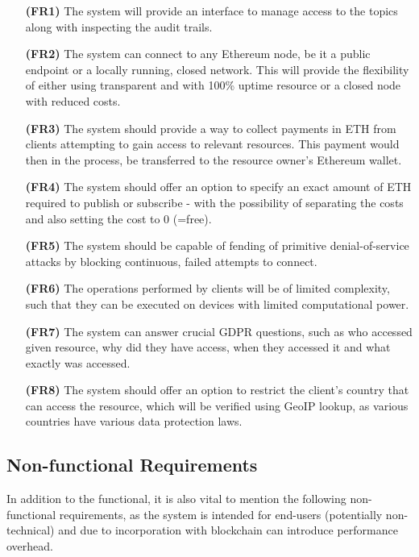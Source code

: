 \begin{itemize}[leftmargin=4.5em]
\item[\textbf{(FR1)}] The system will provide an interface to manage access to the topics along with inspecting the audit trails.
\item[\textbf{(FR2)}] The system can connect to any Ethereum node, be it a public endpoint or a locally running, closed network. This will provide the flexibility of either using transparent and with 100\% uptime resource or a closed node with reduced costs.
\item[\textbf{(FR3)}] The system should provide a way to collect payments in ETH from clients attempting to gain access to relevant resources. This payment would then in the process, be transferred to the resource owner's Ethereum wallet.
\item[\textbf{(FR4)}] The system should offer an option to specify an exact amount of ETH required to publish or subscribe - with the possibility of separating the costs and also setting the cost to 0 (=free).
\item[\textbf{(FR5)}] The system should be capable of fending of primitive denial-of-service attacks by blocking continuous, failed attempts to connect.
\item[\textbf{(FR6)}] The operations performed by clients will be of limited complexity, such that they can be executed on devices with limited computational power.
\item[\textbf{(FR7)}] The system can answer crucial GDPR questions, such as who accessed given resource, why did they have access, when they accessed it and what exactly was accessed.
\item[\textbf{(FR8)}] The system should offer an option to restrict the client's country that can access the resource, which will be verified using GeoIP lookup, as various countries have various data protection laws.
\end{itemize}

\subsection{Non-functional Requirements}

In addition to the functional, it is also vital to mention the following non-functional requirements, as the system is intended for end-users (potentially non-technical) and due to incorporation with blockchain can introduce performance overhead.


